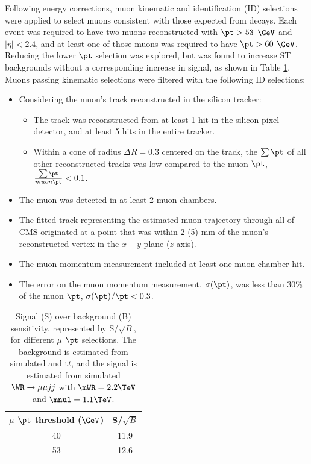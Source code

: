 Following energy corrections, muon kinematic and identification (ID) selections were applied to select muons consistent 
with those expected from \WR decays.  Each event was required to have two muons reconstructed with 
$\pt > 53$ $\GeV$ and $|\eta| < 2.4$, and at least one of those muons was required to have $\pt > 60$ $\GeV$.  
Reducing the lower $\pt$ selection was explored, but was found to increase ST 
backgrounds without a corresponding increase in \WR signal, as shown in Table \ref{tab:lowerMuonPtCuts}.  Muons 
passing kinematic selections were filtered with the following ID selections:

\begin{itemize}
	\item Considering the muon's track reconstructed in the silicon tracker:
	\begin{itemize}
		\item The track was reconstructed from at least 1 hit in the silicon pixel detector, and at least 
			5 hits in the entire tracker.
		\item Within a cone of radius $\Delta R = 0.3$ centered on the track, the $\sum \pt$ of all other 
			reconstructed tracks was low compared to the muon $\pt$, $\frac{\sum \pt}{muon \pt} < 0.1$.
	\end{itemize}
	\item The muon was detected in at least 2 muon chambers.
	\item The fitted track representing the estimated muon trajectory through all of CMS originated at a 
		point that was within 2 (5) mm of the muon's reconstructed vertex in the $x-y$ plane ($z$ axis). 
	\item The muon momentum measurement included at least one muon chamber hit.
	\item The error on the muon momentum measurement, $\sigma(\pt)$, was less than 30\% of the muon $\pt$, 
		$\sigma(\pt)/\pt < 0.3$.
\end{itemize}

\begin{table}[h]
	\caption{Signal (S) over background (B) sensitivity, represented by S/$\sqrt{B}$, for different $\mu$ $\pt$ 
	selections.  The background is estimated from simulated \DY and t$\bar{t}$, and the signal is estimated 
	from simulated $\WR \rightarrow \mu\mu jj$ with $\mWR = 2.2 \TeV$ and $\mnul = 1.1 \TeV$.}
	\label{tab:lowerMuonPtCuts}
	\centering
	\begin{tabular}{c|c}
		$\mu$ $\pt$ threshold ($\GeV$) & S/$\sqrt{B}$ \\  \hline
		40 &  11.9  \\
		53 &  12.6  \\ \hline
	\end{tabular}
\end{table}

